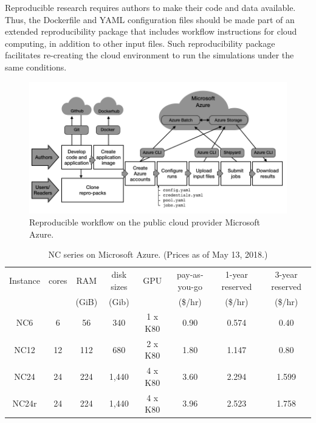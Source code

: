 \documentclass[10pt,journal,compsoc]{IEEEtran}
\begin{document}
Reproducible research requires authors to make their code and data available.
Thus, the Dockerfile and YAML configuration files should be made part of an extended reproducibility package that includes workflow instructions for cloud computing, in addition to other input files.
Such reproducibility package facilitates re-creating the cloud environment to run the simulations under the same conditions.

\begin{figure}[!h]
    \centering
    \includegraphics[width=14cm]{figures/cloud_workflow.png}
    \caption{Reproducible workflow on the public cloud provider Microsoft Azure.}
    \label{fig:cloud_workflow}
\end{figure}

\begin{table}[!h]
    \caption{NC series on Microsoft Azure. (Prices as of May 13, 2018.)}
    \label{tab:nc_series}
    \centering
    \begin{tabular}{cccccccc}
        Instance & cores & RAM & disk sizes & GPU & pay-as-you-go & 1-year reserved & 3-year reserved \\
        && (GiB) & (Gib) && (\$/hr) & (\$/hr) & (\$/hr) \\
        \hline
        NC6 & 6 & 56 & 340 & 1 x K80 & 0.90 & 0.574 & 0.40 \\
        NC12 & 12 & 112 & 680 & 2 x K80 & 1.80 & 1.147 & 0.80 \\
        NC24 & 24 & 224 & 1,440 & 4 x K80 & 3.60 & 2.294 & 1.599 \\
        NC24r\footnotemark & 24 & 224 & 1,440 & 4 x K80 & 3.96 & 2.523 & 1.758 \\
        \hline
    \end{tabular}
\end{table}

\end{document}
